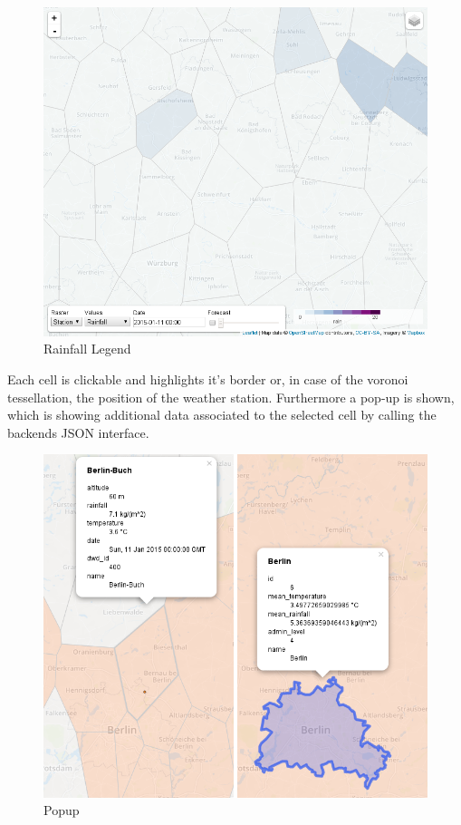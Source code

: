 \documentclass[paper=a4, fontsize=11pt]{scrartcl} %
\numberwithin{equation}{section} %
\numberwithin{figure}{section} %
\numberwithin{table}{section} %
\begin{document}
\begin{figure}[htbp]
\centering
\includegraphics[width=1\textwidth]{pictures/screenshot-legend-rain.png}
\caption{Rainfall Legend}
\end{figure}

Each cell is clickable and highlights it's border or, in case of the
voronoi tessellation, the position of the weather station. Furthermore a
pop-up is shown, which is showing additional data associated to the
selected cell by calling the backends JSON interface.

\begin{figure}[htbp]
\centering
\includegraphics[width=1\textwidth]{pictures/screenshot-popup.png}
\caption{Popup}
\end{figure}
\end{document}
